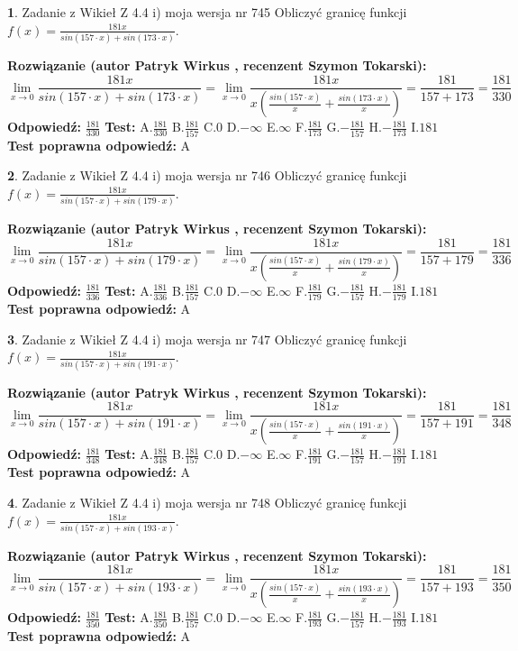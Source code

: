 \documentclass[12pt, a4paper]{article}
\theoremstyle{definition} %
\newtheorem{zad}{}
\newcommand{\zadStart}[1]{\begin{zad}#1\newline}
\newcommand{\zadStop}{\end{zad}}
\newcommand{\rozwStart}[2]{\noindent \textbf{Rozwiązanie (autor #1 , recenzent #2): }\newline}
\newcommand{\rozwStop}{\newline}
\newcommand{\odpStart}{\noindent \textbf{Odpowiedź:}\newline}
\newcommand{\odpStop}{\newline}
\newcommand{\testStart}{\noindent \textbf{Test:}\newline}
\newcommand{\testStop}{\newline}
\newcommand{\kluczStart}{\noindent \textbf{Test poprawna odpowiedź:}\newline}
\newcommand{\kluczStop}{\newline}
\begin{document}
\zadStart{Zadanie z Wikieł Z 4.4 i) moja wersja nr 745}
Obliczyć granicę funkcji $f(x)=\frac{181x}{sin(157\cdot x) +sin(173\cdot x)}$.
\zadStop
\rozwStart{Patryk Wirkus}{Szymon Tokarski}
$$\lim\limits_{x\to 0}\frac{181x}{sin(157\cdot x) +sin(173\cdot x)}=\lim\limits_{x\to 0}\frac{181x}{x(\frac{sin(157\cdot x)}{x}+\frac{sin(173\cdot x)}{x})}=\frac{181}{157+173} = \frac{181}{330}$$
\rozwStop
\odpStart
$\frac{181}{330}$
\odpStop
\testStart
A.$\frac{181}{330}$
B.$\frac{181}{157}$
C.$0$
D.$-\infty$
E.$\infty$
F.$\frac{181}{173}$
G.$-\frac{181}{157}$
H.$-\frac{181}{173}$
I.$181$
\testStop
\kluczStart
A
\kluczStop



\zadStart{Zadanie z Wikieł Z 4.4 i) moja wersja nr 746}
Obliczyć granicę funkcji $f(x)=\frac{181x}{sin(157\cdot x) +sin(179\cdot x)}$.
\zadStop
\rozwStart{Patryk Wirkus}{Szymon Tokarski}
$$\lim\limits_{x\to 0}\frac{181x}{sin(157\cdot x) +sin(179\cdot x)}=\lim\limits_{x\to 0}\frac{181x}{x(\frac{sin(157\cdot x)}{x}+\frac{sin(179\cdot x)}{x})}=\frac{181}{157+179} = \frac{181}{336}$$
\rozwStop
\odpStart
$\frac{181}{336}$
\odpStop
\testStart
A.$\frac{181}{336}$
B.$\frac{181}{157}$
C.$0$
D.$-\infty$
E.$\infty$
F.$\frac{181}{179}$
G.$-\frac{181}{157}$
H.$-\frac{181}{179}$
I.$181$
\testStop
\kluczStart
A
\kluczStop



\zadStart{Zadanie z Wikieł Z 4.4 i) moja wersja nr 747}
Obliczyć granicę funkcji $f(x)=\frac{181x}{sin(157\cdot x) +sin(191\cdot x)}$.
\zadStop
\rozwStart{Patryk Wirkus}{Szymon Tokarski}
$$\lim\limits_{x\to 0}\frac{181x}{sin(157\cdot x) +sin(191\cdot x)}=\lim\limits_{x\to 0}\frac{181x}{x(\frac{sin(157\cdot x)}{x}+\frac{sin(191\cdot x)}{x})}=\frac{181}{157+191} = \frac{181}{348}$$
\rozwStop
\odpStart
$\frac{181}{348}$
\odpStop
\testStart
A.$\frac{181}{348}$
B.$\frac{181}{157}$
C.$0$
D.$-\infty$
E.$\infty$
F.$\frac{181}{191}$
G.$-\frac{181}{157}$
H.$-\frac{181}{191}$
I.$181$
\testStop
\kluczStart
A
\kluczStop



\zadStart{Zadanie z Wikieł Z 4.4 i) moja wersja nr 748}
Obliczyć granicę funkcji $f(x)=\frac{181x}{sin(157\cdot x) +sin(193\cdot x)}$.
\zadStop
\rozwStart{Patryk Wirkus}{Szymon Tokarski}
$$\lim\limits_{x\to 0}\frac{181x}{sin(157\cdot x) +sin(193\cdot x)}=\lim\limits_{x\to 0}\frac{181x}{x(\frac{sin(157\cdot x)}{x}+\frac{sin(193\cdot x)}{x})}=\frac{181}{157+193} = \frac{181}{350}$$
\rozwStop
\odpStart
$\frac{181}{350}$
\odpStop
\testStart
A.$\frac{181}{350}$
B.$\frac{181}{157}$
C.$0$
D.$-\infty$
E.$\infty$
F.$\frac{181}{193}$
G.$-\frac{181}{157}$
H.$-\frac{181}{193}$
I.$181$
\testStop
\kluczStart
A
\kluczStop
\end{document}
